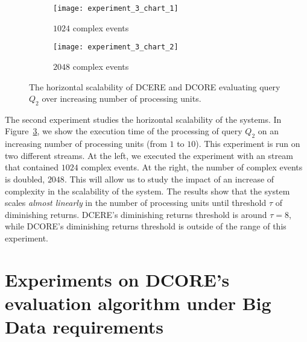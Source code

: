 \begin{figure}[H]
     \begin{adjustbox}{max width=1.2\linewidth,center}
     \centering
     \begin{subfigure}[b]{0.7\textwidth}
         \centering
         \texttt{[image: experiment\_3\_chart\_1]}
         \caption{$1024$ complex events}
         \label{fig:experiment:3:subfigure:1}
     \end{subfigure}
     \begin{subfigure}[b]{0.7\textwidth}
         \centering
         \texttt{[image: experiment\_3\_chart\_2]}
         \caption{$2048$ complex events}
         \label{fig:experiment:3:subfigure:1}
     \end{subfigure}
     \end{adjustbox}
     \caption{The horizontal scalability of DCERE and DCORE evaluating query $Q_{2}$ over increasing number of processing units.}
     \label{fig:experiment:3}
\end{figure}

The second experiment studies the horizontal scalability of the systems. In Figure~\ref{fig:experiment:3}, we show the execution time of the processing of query $Q_{2}$ on an increasing number of processing units (from $1$ to $10$). This experiment is run on two different streams. At the left, we executed the experiment with an stream that contained $1024$ complex events. At the right, the number of complex events is doubled, $2048$. This will allow us to study the impact of an increase of complexity in the scalability of the system. The results show that the system scales \emph{almost linearly} in the number of processing units until threshold $\tau$ of diminishing returns. DCERE's diminishing returns threshold is around $\tau = 8$, while DCORE's diminishing returns threshold is outside of the range of this experiment.

\section{Experiments on DCORE's evaluation algorithm under Big Data requirements}\label{sec:new-algorithm}

